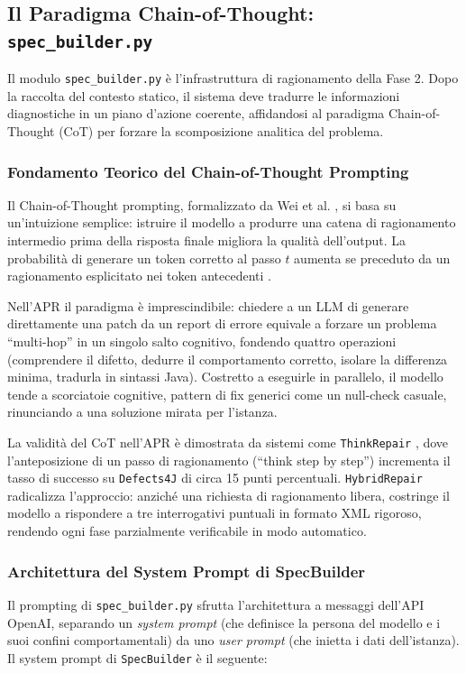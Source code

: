 \subsection{Il Paradigma Chain-of-Thought: \texttt{spec\_builder.py}}
Il modulo \texttt{spec\_builder.py} è l'infrastruttura di ragionamento della Fase 2. Dopo la raccolta del contesto
statico, il sistema deve tradurre le informazioni diagnostiche in un piano d'azione coerente, affidandosi al
paradigma Chain-of-Thought (CoT) per forzare la scomposizione analitica del problema.

\subsubsection{Fondamento Teorico del Chain-of-Thought Prompting}
\label{subsubsec:3_3_3_1}
Il Chain-of-Thought prompting, formalizzato da Wei et al. \cite{wei2022chain}, si basa su un'intuizione semplice:
istruire il modello a produrre una catena di ragionamento intermedio prima della risposta finale migliora la
qualità dell'output. La probabilità di generare un token corretto al passo $t$ aumenta se preceduto da un
ragionamento esplicitato nei token antecedenti \cite{wei2022chain}.

Nell'APR il paradigma è imprescindibile: chiedere a un LLM di generare direttamente una patch da un report di
errore equivale a forzare un problema ``multi-hop'' in un singolo salto cognitivo, fondendo quattro operazioni
(comprendere il difetto, dedurre il comportamento corretto, isolare la differenza minima, tradurla in sintassi
Java). Costretto a eseguirle in parallelo, il modello tende a scorciatoie cognitive, pattern di fix generici
come un null-check casuale, rinunciando a una soluzione mirata per l'istanza.

La validità del CoT nell'APR è dimostrata da sistemi come \texttt{ThinkRepair} \cite{yin2024thinkrepair}, dove
l'anteposizione di un passo di ragionamento (``think step by step'') incrementa il tasso di successo su
\texttt{Defects4J} di circa 15 punti percentuali. \texttt{HybridRepair} radicalizza l'approccio: anziché una
richiesta di ragionamento libera, costringe il modello a rispondere a tre interrogativi puntuali in formato XML
rigoroso, rendendo ogni fase parzialmente verificabile in modo automatico.


\subsubsection{Architettura del System Prompt di SpecBuilder}
\label{subsubsec:3_3_3_2}
Il prompting di \texttt{spec\_builder.py} sfrutta l'architettura a messaggi dell'API OpenAI, separando un
\textit{system prompt} (che definisce la persona del modello e i suoi confini comportamentali) da uno \textit{user
prompt} (che inietta i dati dell'istanza). Il system prompt di \texttt{SpecBuilder} è il seguente:

